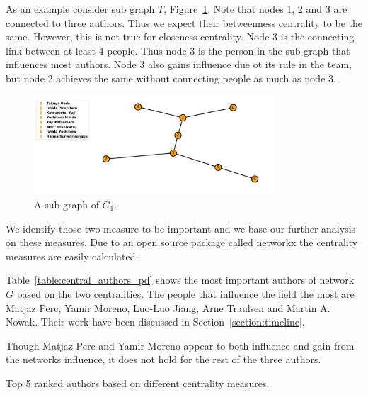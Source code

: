 \documentclass{article}
\begin{document}
As an example consider sub graph \(T\), Figure~\ref{fig:subgraph_t}. Note that
nodes 1, 2 and 3 are connected to three authors. Thus we expect their betweenness
centrality to be the same. However, this is not true for closeness centrality.
Node 3 is the connecting link between at least 4 people. Thus node 3
is the person in the sub graph that influences most authors. Node 3 also gains
influence due ot its rule in the team, but node 2 achieves the same without connecting
people as much as node 3.

\begin{figure}[!hbtp]
    \centering
    \includegraphics[width=0.8\textwidth]{./assets/images/centrality_example.pdf}
    \caption{A sub graph of \(G_1\).}\label{fig:subgraph_t}
\end{figure}

We identify those two measure to be important and we base our further analysis
on these measures. Due to an open source package called networkx the centrality
measures are easily calculated.

Table~\ref{table:central_authors_pd} shows the most important authors of network
\(G\) based on the two centralities. The people that influence the field the most
are Matjaz Perc, Yamir Moreno, Luo-Luo Jiang, Arne Traulsen and Martin A. Nowak.
Their work have been discussed in Section~\ref{section:timeline}.

Though Matjaz Perc and Yamir Moreno appear to both influence and gain from
the networks influence, it does not hold for the rest of the three authors.

\begin{table}[!hbtp]
    \begin{center}
    \scalebox{0.8}{
    
    }
    \caption{Top 5 ranked authors based on different centrality measures.}
    \label{table:central_authors_pd}
    \end{center}
\end{table}
\end{document}
